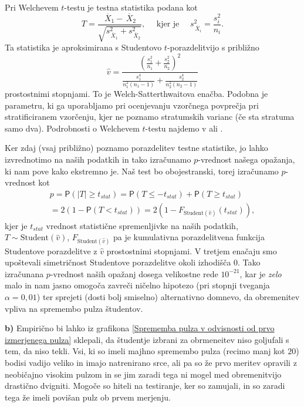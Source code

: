 \documentclass[a4paper,11pt]{article}
\newcommand{\olsi}[1]{\,\overline{\!{#1}}} %
\newcommand{\prob}{\mathsf{P}}
\begin{document}
Pri Welchevem $t$-testu je testna statistika podana kot
\[
    T = \frac{\olsi{X}_1 - \olsi{X}_2}{\sqrt{s_{\olsi{X}_1}^2 + s_{\olsi{X}_2}^2}},
    \quad \text{ kjer je }\quad s^2_{\olsi{X}_i} = \frac{s^2_i}{n_i}.
\]
Ta statistika je aproksimirana s Studentovo $t$-porazdelitvijo s približno 
\[
\hat{v} = \frac{\left(\frac{s_1^2}{n_1} + \frac{s_2^2}{n_2}\right)^2}{\frac{s_1^4}{n_1^2(n_1 - 1)} + \frac{s_2^4}{n_2^2(n_2 - 1)}} 
\]
prostostnimi stopnjami. To je Welch-Satterthwaitova enačba. Podobna je parametru, ki ga uporabljamo pri ocenjevanju vzorčnega povprečja pri stratificiranem vzorčenju, kjer ne poznamo stratumskih varianc (če sta stratuma samo dva). Podrobnosti o Welchevem $t$-testu najdemo v \cite{Welch} ali \cite[\S11]{Rice}.

Ker zdaj (vsaj približno) poznamo porazdelitev testne statistike, jo lahko izvrednotimo na naših podatkih in tako izračunamo $p$-vrednost našega opažanja, ki nam pove kako ekstremno je. Naš test bo obojestranski, torej izračunamo $p$-vrednost kot
\begin{multline*}
    p = \prob(\lvert T \rvert \geq t_{stat}) = 
    \prob(T \leq -t_{stat}) + \prob(T \geq t_{stat}) \\ = 
    2(1 - \prob(T < t_{stat})) = 
    2(1 - F_{\text{Student}(\hat{v})}(t_{stat})), 
\end{multline*}
kjer je $t_{stat}$ vrednost statistične spremenljivke na naših podatkih, $T \sim \text{Student}(\hat{v})$, $F_{\text{Student}(\hat{v})}$ pa je kumulativna porazdelitvena funkcija Studentove porazdelitve z $\hat v$ prostostnimi stopnjami. V tretjem enačaju smo upoštevali simetričnost Studentove porazdelitve okoli izhodišča $0$. Tako izračunana $p$-vrednost naših opažanj dosega velikostne rede $10^{-21}$, kar je \emph{zelo} malo in nam jasno omogoča zavreči ničelno hipotezo (pri stopnji tveganja $\alpha = 0,01$) ter sprejeti (dosti bolj smiselno) alternativno domnevo, da obremenitev vpliva na spremembo pulza študentov. 
\newline

\noindent
\textbf{b)} Empirično bi lahko  iz grafikona \ref{Sprememba pulza v odvisnosti od prvo izmerjenega pulza} sklepali, da študentje izbrani za obrmeneitev niso goljufali s tem, da niso tekli. Vsi, ki so imeli majhno spremembo pulza (recimo manj kot $20$) bodisi vadijo veliko in imajo natrenirano srce, ali pa so že prvo meritev opravili z neobičajno visokim pulzom in se jim zaradi tega ni mogel med obremenitvijo drastično dvigniti. Mogoče so hiteli na testiranje, ker so zamujali, in so zaradi tega že imeli povišan pulz ob prvem merjenju.
\end{document}
